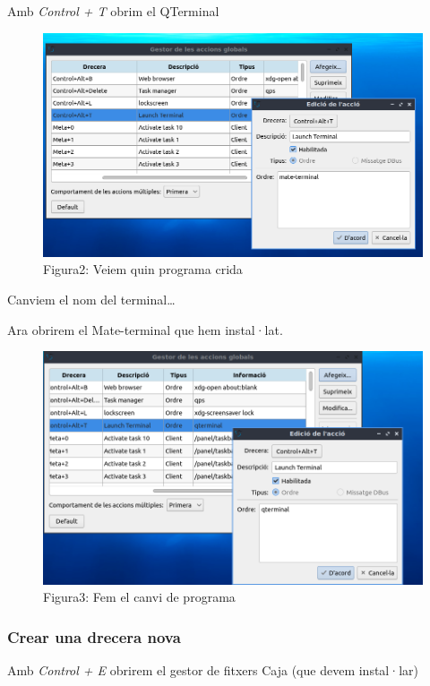 \documentclass[
  a4paper,
]{article}
\begin{document}
Amb \emph{Control + T} obrim el QTerminal

\begin{figure}
\centering
\includegraphics{png/Drecera1.png}
\caption{Figura2: Veiem quin programa crida}
\end{figure}

Canviem el nom del terminal\ldots{}

Ara obrirem el Mate-terminal que hem instal·lat.

\begin{figure}
\centering
\includegraphics{png/Drecera2.png}
\caption{Figura3: Fem el canvi de programa}
\end{figure}

\subsubsection{Crear una drecera nova}\label{crear-una-drecera-nova}

Amb \emph{Control + E} obrirem el gestor de fitxers Caja (que devem
instal·lar)
\end{document}
